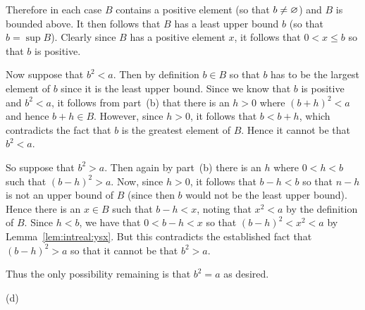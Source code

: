 {{    Therefore in each case $B$ contains a positive element (so that $b \neq \varnothing$) and $B$ is bounded above.
    It then follows that $B$ has a least upper bound $b$ (so that $b = \sup{B}$).
    Clearly since $B$ has a positive element $x$, it follows that $0 < x \leq b$ so that $b$ is positive.

    Now suppose that $b^2 < a$.
    Then by definition $b \in B$ so that $b$ has to be the largest element of $b$ since it is the least upper bound.
    Since we know that $b$ is positive and $b^2 < a$, it follows from part~(b) that there is an $h > 0$ where $(b+h)^2 < a$ and hence $b+h \in B$.
    However, since $h>0$, it follows that $b < b+h$, which contradicts the fact that $b$ is the greatest element of $B$.
    Hence it cannot be that $b^2 < a$.

    So suppose that $b^2 > a$.
    Then again by part~(b) there is an $h$ where $0 < h < b$ such that $(b-h)^2 > a$.
    Now, since $h> 0$, it follows that $b-h < b$ so that $n-h$ is not an upper bound of $B$ (since then $b$ would not be the least upper bound).
    Hence there is an $x \in B$ such that $b-h < x$, noting that $x^2 < a$ by the definition of $B$.
    Since $h < b$, we have that $0 < b - h < x$ so that $(b-h)^2 < x^2 < a$ by Lemma~\ref{lem:intreal:ysx}.
    But this contradicts the established fact that $(b-h)^2 > a$ so that it cannot be that $b^2 > a$.

    Thus the only possibility remaining is that $b^2 = a$ as desired.
  }

  (d)
}

